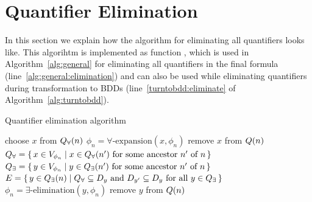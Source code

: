 \documentclass[
  digital, %
  twoside, %
  table,   %
  nolof,     %
  nolot,     %
]{fithesis3}
\let\setbuilder\set
\newcommand{\simpleset}[1]{\{{#1}\}}
\renewcommand{\set}[1]{\normalexpandarg\IfSubStr{#1}{|}{\setbuilder{#1}}{\simpleset{#1}}}
\theoremstyle{definition}
\theoremstyle{remark}
\newcommand{\vars}[1]{V_{#1}}
\begin{document}

\section{Quantifier Elimination}
In this section we explain how the algorithm for eliminating all quantifiers looks like. This algorihtm is implemented as function , which is used in Algorithm~\ref{alg:general} for eliminating all quantifiers in the final formula (line~\ref{alg:general:elimination}) and can also be used while eliminating quantifiers during transformation to BDDs (line~\ref{turntobdd:eliminate} of Algorithm~\ref{alg:turntobdd}).

\begin{algorithm}
  \caption{Quantifier elimination algorithm}
  \label{alg:allelimination}
  \begin{algorithmic}[1]
        \State choose $x$ from $Q_{\forall}(n)$\label{allelimination:choose}
        \State $\phi_n = \forall\text{-expansion}(x,\phi_n)$ \label{allelimination:uelim}
        \State remove $x$ from $Q({n})$\label{allelimination:uremove}
        \State $Q_{\forall} = \set{x \in \vars{\phi_n} | x \in \uprefix{n'} \text{ for some ancestor } n' \text{ of } n}$\label{allelimination:uset}
        \State $Q_{\exists} = \set{y \in \vars{\phi_n} | y \in \eprefix{n'} \text{ for some ancestor } n' \text{ of } n}$\label{allelimination:eset}
        \State $E = \set{y \in \eprefix{n} | Q_{\forall} \subseteq D_y \text{ and } D_{y'} \subseteq D_y \text{ for all } y \in Q_{\exists}}$\label{allelimination:etoremove}
        \label{allelimination:eelimforstart}
          \State $\phi_n = \exists\text{-elimination}(y,\phi_n)$\label{allelimination:eelim}
          \State remove $y$ from $Q({n})$\label{allelimination:eremove}
        \EndFor\label{allelimination:eelimforend}
      \EndWhile
    \EndFunction
  \end{algorithmic}
\end{algorithm}
\end{document}
